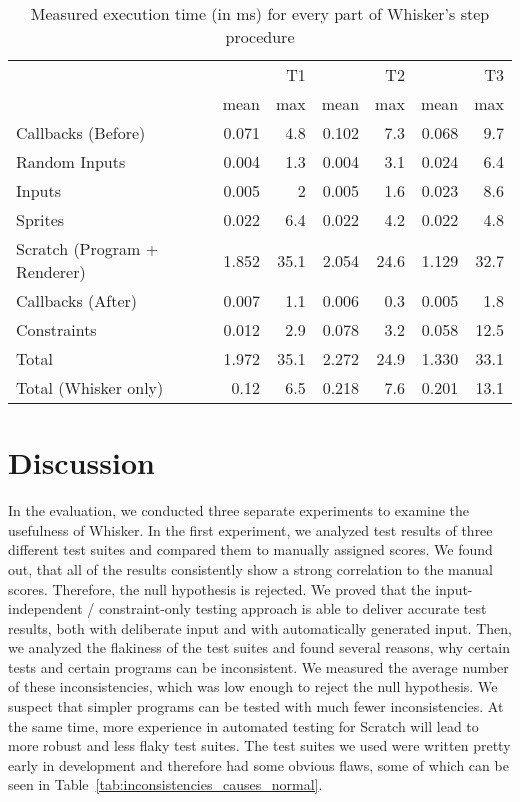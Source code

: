 \begin{table}[htpb]
    \centering
    \footnotesize
    \begin{tabular}{l|rr|rr|rr}
        \toprule
                                     &       & T1   &       & T2   &       & T3   \\
                                     & mean  & max  & mean  & max  & mean  & max  \\
        \midrule
        Callbacks (Before)           & 0.071 & 4.8  & 0.102 & 7.3  & 0.068 & 9.7  \\
        Random Inputs                & 0.004 & 1.3  & 0.004 & 3.1  & 0.024 & 6.4  \\
        Inputs                       & 0.005 & 2    & 0.005 & 1.6  & 0.023 & 8.6  \\
        Sprites                      & 0.022 & 6.4  & 0.022 & 4.2  & 0.022 & 4.8  \\
        Scratch (Program + Renderer) & 1.852 & 35.1 & 2.054 & 24.6 & 1.129 & 32.7 \\
        Callbacks (After)            & 0.007 & 1.1  & 0.006 & 0.3  & 0.005 & 1.8  \\
        Constraints                  & 0.012 & 2.9  & 0.078 & 3.2  & 0.058 & 12.5 \\
        \midrule
        Total                        & 1.972 & 35.1 & 2.272 & 24.9 & 1.330 & 33.1 \\
        Total (Whisker only)         & 0.12  & 6.5  & 0.218 & 7.6  & 0.201 & 13.1 \\
        \bottomrule
    \end{tabular}
    \caption{Measured execution time (in ms) for every part of Whisker's step procedure}
    \label{tab:time_measurements}
\end{table}

\section{Discussion}
\label{sec:discussion}

In the evaluation, we conducted three separate experiments to examine the usefulness of Whisker.
In the first experiment, we analyzed test results of three different test suites and compared them to manually assigned scores.
We found out, that all of the results consistently show a strong correlation to the manual scores.
Therefore, the null hypothesis is rejected.
We proved that the input-independent / constraint-only testing approach is able to deliver accurate test results,
both with deliberate input and with automatically generated input.
Then, we analyzed the flakiness of the test suites and found several reasons,
why certain tests and certain programs can be inconsistent.
We measured the average number of these inconsistencies, which was low enough to reject the null hypothesis.
We suspect that simpler programs can be tested with much fewer inconsistencies.
At the same time, more experience in automated testing for Scratch will lead to more robust and less flaky test suites.
The test suites we used were written pretty early in development and therefore had some obvious flaws,
some of which can be seen in Table~\ref{tab:inconsistencies_causes_normal}.
\parspace

